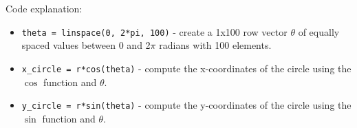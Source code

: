 Code explanation:
\begin{itemize}
  \item \texttt{\color{mygreen}theta = linspace(0, 2*pi, 100)} - create a 1x100 row vector $\theta$ of equally spaced values between 0 and 2$\pi$ radians with 100 elements.
  \item \texttt{\color{mygreen}x\_circle = r*cos(theta)} - compute the x-coordinates of the circle using the $\cos$ function and $\theta$.
  \item \texttt{\color{mygreen}y\_circle = r*sin(theta)} - compute the y-coordinates of the circle using the $\sin$ function and $\theta$.
\end{itemize}

\vspace*{2cm}